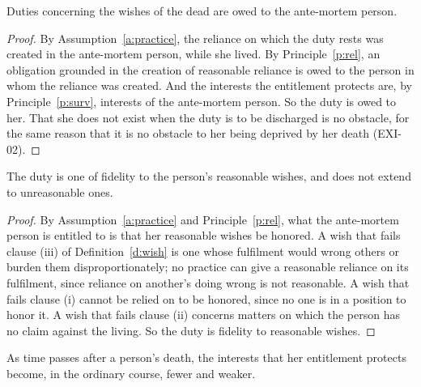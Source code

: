 \documentclass{situationist-preprint}
\begin{document}
\begin{lemma}[Subject]\label{l:subject}
Duties concerning the wishes of the dead are owed to the ante-mortem person.
\end{lemma}

\begin{proof}
By Assumption~\ref{a:practice}, the reliance on which the duty rests was created in the ante-mortem person, while she lived. By Principle~\ref{p:rel}, an obligation grounded in the creation of reasonable reliance is owed to the person in whom the reliance was created. And the interests the entitlement protects are, by Principle~\ref{p:surv}, interests of the ante-mortem person. So the duty is owed to her. That she does not exist when the duty is to be discharged is no obstacle, for the same reason that it is no obstacle to her being deprived by her death (EXI-02).
\end{proof}

\begin{lemma}[Content]\label{l:content}
The duty is one of fidelity to the person's reasonable wishes, and does not extend to unreasonable ones.
\end{lemma}

\begin{proof}
By Assumption~\ref{a:practice} and Principle~\ref{p:rel}, what the ante-mortem person is entitled to is that her reasonable wishes be honored. A wish that fails clause (iii) of Definition~\ref{d:wish} is one whose fulfilment would wrong others or burden them disproportionately; no practice can give a reasonable reliance on its fulfilment, since reliance on another's doing wrong is not reasonable. A wish that fails clause (i) cannot be relied on to be honored, since no one is in a position to honor it. A wish that fails clause (ii) concerns matters on which the person has no claim against the living. So the duty is fidelity to reasonable wishes.
\end{proof}

\begin{lemma}[Weakening]\label{l:weak}
As time passes after a person's death, the interests that her entitlement protects become, in the ordinary course, fewer and weaker.
\end{lemma}
\end{document}
